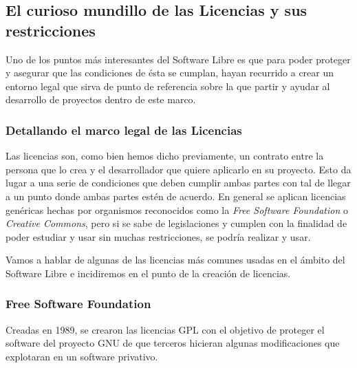 \subsection{El curioso mundillo de las Licencias y sus restricciones}

Uno de los puntos más interesantes del Software Libre es que para poder proteger y asegurar que las condiciones de ésta se cumplan, hayan recurrido a crear un entorno legal que sirva de punto de referencia sobre la que partir y ayudar al desarrollo de proyectos dentro de este marco. \cite{foss-marcojuridico}

\subsubsection{Detallando el marco legal de las Licencias}
Las licencias son, como bien hemos dicho previamente, un contrato entre la persona que lo crea y el desarrollador que quiere aplicarlo en su proyecto. Esto da lugar a una serie de condiciones que deben cumplir ambas partes con tal de llegar a un punto donde ambas partes estén de acuerdo. En general se aplican licencias genéricas hechas por organismos reconocidos como la \textit{Free Software Foundation} o \textit{Creative Commons}, pero si se sabe de legislaciones y cumplen con la finalidad de poder estudiar y usar sin muchas restricciones, se podría realizar y usar.

Vamos a hablar de algunas de las licencias más comunes usadas en el ámbito del Software Libre e incidiremos en el punto de la creación de licencias.

\subsubsection{Free Software Foundation}
Creadas en 1989, se crearon las licencias GPL con el objetivo de proteger el software del proyecto GNU de que terceros hicieran algunas modificaciones que explotaran en un software privativo.

